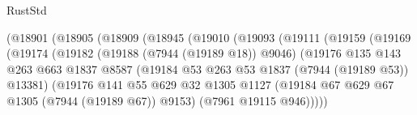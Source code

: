 \begin{lexlean}{RustStd}
\begin{coremodule}
                                  (@18901
                                    (@18905
                                      (@18909
                                        (@18945
                                          (@19010
                                            (@19093
                                              (@19111
                                                (@19159
                                                  (@19169
                                                    (@19174
                                                      (@19182
                                                        (@19188 (@7944 (@19189 @18)) @9046)
                                                        (@19176
                                                          @135
                                                          @143
                                                          @263
                                                          @663
                                                          @1837
                                                          @8587
                                                          (@19184
                                                            @53
                                                            @263
                                                            @53
                                                            @1837
                                                            (@7944 (@19189 @53))
                                                            @13381)
                                                          (@19176
                                                            @141
                                                            @55
                                                            @629
                                                            @32
                                                            @1305
                                                            @1127
                                                            (@19184
                                                              @67
                                                              @629
                                                              @67
                                                              @1305
                                                              (@7944 (@19189 @67))
                                                              @9153)
                                                            (@7961 @19115 @946)))))

\end{coremodule}
\end{lexlean}
